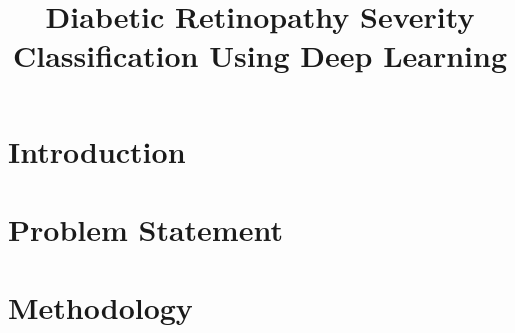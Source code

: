 \documentclass[12pt]{article}
\title{Diabetic Retinopathy Severity Classification Using Deep Learning}
\author{}
\date{}
\begin{document}
\maketitle

\begin{abstract}
\end{abstract}

\section{Introduction}

\section{Problem Statement}

\section{Methodology}

\end{document}
